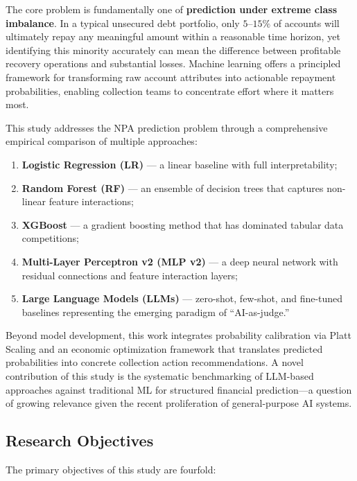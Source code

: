 \documentclass[12pt, a4paper]{article}
\begin{document}
The core problem is fundamentally one of \textbf{prediction under extreme class imbalance}. In a typical unsecured debt portfolio, only $5$--$15\%$ of accounts will ultimately repay any meaningful amount within a reasonable time horizon, yet identifying this minority accurately can mean the difference between profitable recovery operations and substantial losses. Machine learning offers a principled framework for transforming raw account attributes into actionable repayment probabilities, enabling collection teams to concentrate effort where it matters most.

This study addresses the NPA prediction problem through a comprehensive empirical comparison of multiple approaches:
\begin{enumerate}[leftmargin=*]
    \item \textbf{Logistic Regression (LR)} --- a linear baseline with full interpretability;
    \item \textbf{Random Forest (RF)} --- an ensemble of decision trees that captures non-linear feature interactions;
    \item \textbf{XGBoost} --- a gradient boosting method that has dominated tabular data competitions;
    \item \textbf{Multi-Layer Perceptron v2 (MLP v2)} --- a deep neural network with residual connections and feature interaction layers;
    \item \textbf{Large Language Models (LLMs)} --- zero-shot, few-shot, and fine-tuned baselines representing the emerging paradigm of ``AI-as-judge.''
\end{enumerate}

Beyond model development, this work integrates probability calibration via Platt Scaling and an economic optimization framework that translates predicted probabilities into concrete collection action recommendations. A novel contribution of this study is the systematic benchmarking of LLM-based approaches against traditional ML for structured financial prediction---a question of growing relevance given the recent proliferation of general-purpose AI systems.

\subsection{Research Objectives}

The primary objectives of this study are fourfold:
\end{document}
